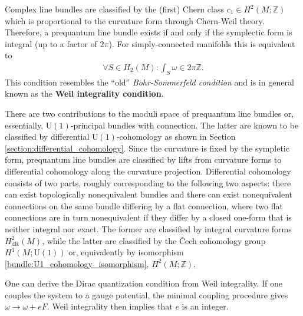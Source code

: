     \begin{property}
        Complex line bundles are classified by the (first) Chern class $c_1\in H^2(M;\mathbb{Z})$ which is proportional to the curvature form through Chern-Weil theory. Therefore, a prequantum line bundle exists if and only if the symplectic form is integral (up to a factor of $2\pi$). For simply-connected manifolds this is equivalent to
        \begin{gather}
            \forall S\in H_2(M):\int_S\omega\in 2\pi\mathbb{Z}.
        \end{gather}
        This condition resembles the ``old'' \textit{Bohr-Sommerfeld condition} and is in general known as the \textbf{Weil integrality condition}.

        There are two contributions to the moduli space of prequantum line bundles or, essentially, $\mathrm{U}(1)$-principal bundles with connection. The latter are known to be classified by differential $\mathrm{U}(1)$-cohomology as shown in Section \ref{section:differential_cohomology}. Since the curvature is fixed by the sympletic form, prequantum line bundles are classified by lifts from curvature forms to differential cohomology along the curvature projection. Differential cohomology consists of two parts, roughly corresponding to the following two aspects: there can exist topologically nonequivalent bundles and there can exist nonequivalent connections on the same bundle differing by a flat connection, where two flat connections are in turn nonequivalent if they differ by a closed one-form that is neither integral nor exact. The former are classified by integral curvature forms $H^2_\mathrm{dR}(M)$, while the latter are classified by the \v{C}ech cohomology group $H^1(M;\mathrm{U}(1))$ or, equivalently by isomorphism \eqref{bundle:U1_cohomology_isomorphism}, $H^2(M;\mathbb{Z})$.
    \end{property}
    \begin{result}
        One can derive the Dirac quantization condition from Weil integrality. If one couples the system to a gauge potential, the minimal coupling procedure gives $\omega\longrightarrow\omega+eF$. Weil integrality then implies that $e$ is an integer.
    \end{result}

